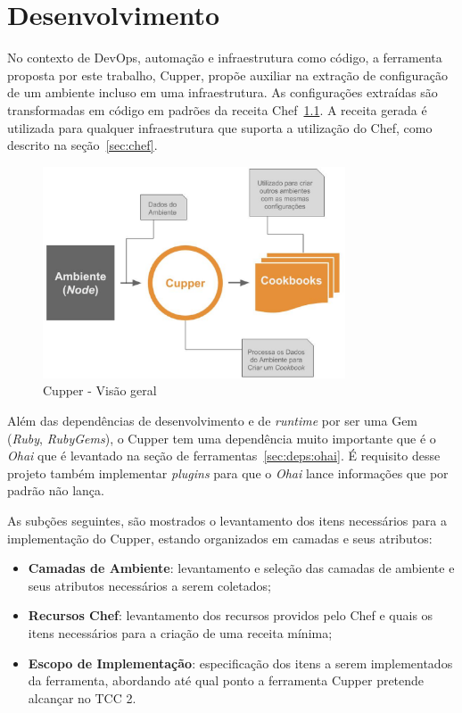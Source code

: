 \newpage\null\thispagestyle{empty}\newpage
\chapter{Desenvolvimento}
\label{chap:desenv}

No contexto de DevOps, automação e infraestrutura como código, a ferramenta
proposta por este trabalho, Cupper, propõe auxiliar na extração de configuração
de um ambiente incluso em uma infraestrutura. As configurações extraídas são
transformadas em código em padrões da receita Chef~\ref{fig:cupper_geral}. A
receita gerada é utilizada para qualquer infraestrutura que suporta a
utilização do Chef, como descrito na seção~\ref{sec:chef}.

\begin{figure}[h]
  \centering
  \includegraphics[width=0.8\textwidth]{figuras/cupper_geral.eps}
  \caption{Cupper - Visão geral}
  \label{fig:cupper_geral}
\end{figure}

Além das dependências de desenvolvimento e de \textit{runtime} por ser uma Gem
(\textit{Ruby}, \textit{RubyGems}), o Cupper tem uma dependência muito
importante que é o \textit{Ohai} que é levantado na seção de 
ferramentas~\ref{sec:deps:ohai}. É requisito desse projeto também implementar
\textit{plugins} para que o \textit{Ohai} lance informações que por padrão 
não lança.

As subções seguintes, são mostrados o levantamento dos itens necessários para
a implementação do Cupper, estando organizados em camadas e seus atributos:

\begin{itemize}
  \item \textbf{Camadas de Ambiente}: levantamento e seleção das camadas de ambiente
    e seus atributos necessários a serem coletados;
  \item \textbf{Recursos Chef}: levantamento dos recursos providos pelo Chef e quais os
    itens necessários para a criação de uma receita mínima;
  \item \textbf{Escopo de Implementação}: especificação dos itens a serem implementados
    da ferramenta, abordando até qual ponto a ferramenta Cupper pretende alcançar
    no TCC 2.
\end{itemize}




